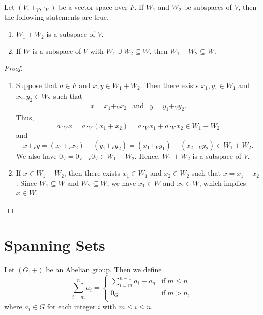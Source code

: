 \begin{theorem}\label{thm:sum}
  Let $(V, +_V, \cdot_V)$ be a vector space over $F$.
  If $W_1$ and $W_2$ be subspaces of $V$, then the following statements are
  true.
  \begin{enumerate}
    \item $W_1 + W_2$ is a subspace of $V$.
    \item If $W$ is a subspace of $V$ with $W_1 \cup W_2 \subseteq W$,
      then $W_1 + W_2 \subseteq W$.
  \end{enumerate}
\end{theorem}
\begin{proof} \leavevmode
  \begin{enumerate}
    \item Suppose that $a \in F$ and $x, y \in W_1 + W_2$.
      Then there exists $x_1, y_1 \in W_1$ and $x_2, y_2 \in W_2$ such that
      \begin{equation*}
        \begin{array}{lll}
        x = x_1 +_V x_2
          & \text{and}
          & y = y_1 +_V y_2.
        \end{array}
      \end{equation*}
      Thus,
      \begin{equation*}
        a \cdot_V x
          = a \cdot_V (x_1 + x_2)
          = a \cdot_V x_1 + a \cdot_V x_2
          \in W_1 + W_2
      \end{equation*}
      and
      \begin{equation*}
        x +_V y
          = (x_1 +_V x_2) + (y_1 +_V y_2)
          = (x_1 +_V y_1) + (x_2 +_V y_2)
          \in W_1 + W_2.
      \end{equation*}
      We also have $0_V = 0_V +_V 0_V \in W_1 + W_2$.
      Hence, $W_1 + W_2$ is a subspace of $V$.
    \item If $x \in W_1 + W_2$, then there exists $x_1 \in W_1$ and
      $x_2 \in W_2$ such that $x = x_1 + x_2$.
      Since $W_1 \subseteq W$ and $W_2 \subseteq W$, we have $x_1 \in W$ and
      $x_2 \in W$, which implies $x \in W$. \qedhere
  \end{enumerate}
\end{proof}

\section{Spanning Sets}
\begin{definition}\label{def:summation}
  Let $(G, +)$ be an Abelian group.
  Then we define
  \begin{equation*}
    \sum_{i=m}^n a_i =
      \left\{
      \begin{array}{ll}
        \displaystyle
          \sum_{i=m}^{n-1} a_i + a_n & \text{if} \; m \leq n\\[1.5em]
        0_G & \text{if} \; m > n,\\
      \end{array}
      \right.
  \end{equation*}
  where $a_i \in G$ for each integer $i$ with $m \leq i \leq n$.
\end{definition}

